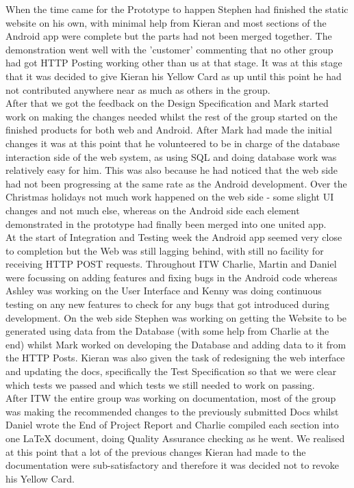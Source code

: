 \documentclass{article}
\begin{document}
		When the time came for the Prototype to happen Stephen had finished the static website on his own, with minimal help from Kieran and most sections of the Android app were complete but the parts had not been merged together. The demonstration went well with the 'customer' commenting that no other group had got HTTP Posting working other than us at that stage. It was at this stage that it was decided to give Kieran his Yellow Card as up until this point he had not contributed anywhere near as much as others in the group. \\

		After that we got the feedback on the Design Specification and Mark started work on making the changes needed whilst the rest of the group started on the finished products for both web and Android. After Mark had made the initial changes it was at this point that he volunteered to be in charge of the database interaction side of the web system, as using SQL and doing database work was relatively easy for him. This was also because he had noticed that the web side had not been progressing at the same rate as the Android development. Over the Christmas holidays not much work happened on the web side - some slight UI changes and not much else, whereas on the Android side each element demonstrated in the prototype had finally been merged into one united app. \\

		At the start of Integration and Testing week the Android app seemed very close to completion but the Web was still lagging behind, with still no facility for receiving HTTP POST requests. Throughout ITW Charlie, Martin and Daniel were focussing on adding features and fixing bugs in the Android code whereas Ashley was working on the User Interface and Kenny was doing continuous testing on any new features to check for any bugs that got introduced during development. On the web side Stephen was working on getting the Website to be generated using data from the Database (with some help from Charlie at the end) whilst Mark worked on developing the Database and adding data to it from the HTTP Posts. Kieran was also given the task of redesigning the web interface and updating the docs, specifically the Test Specification so that we were clear which tests we passed and which tests we still needed to work on passing. \\

		After ITW the entire group was working on documentation, most of the group was making the recommended changes to the previously submitted Docs whilst Daniel wrote the End of Project Report and Charlie compiled each section into one LaTeX document, doing Quality Assurance checking as he went. We realised at this point that a lot of the previous changes Kieran had made to the documentation were sub-satisfactory and therefore it was decided not to revoke his Yellow Card.
\end{document}
